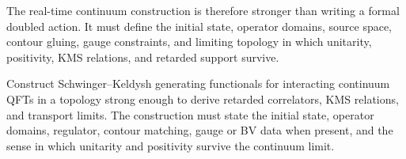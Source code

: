 The real-time continuum construction is therefore stronger than writing a
formal doubled action.  It must define the initial state, operator domains,
source space, contour gluing, gauge constraints, and limiting topology in
which unitarity, positivity, KMS relations, and retarded support survive.

\begin{openproblem}
\label{op:real-time-sk-continuum-construction}
Construct Schwinger--Keldysh generating functionals for interacting continuum
QFTs in a topology strong enough to derive retarded correlators, KMS
relations, and transport limits.  The construction must state the initial
state, operator domains, regulator, contour matching, gauge or BV data when
present, and the sense in which unitarity and positivity survive the
continuum limit.
\end{openproblem}
